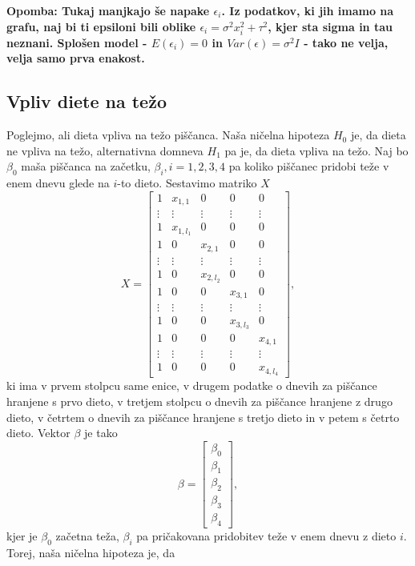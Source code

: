\documentclass[a4paper,12pt]{article}
\begin{document}
\textbf{Opomba: Tukaj manjkajo še napake $\epsilon_i$. Iz podatkov, ki jih imamo na grafu, naj bi ti epsiloni bili oblike 
$\epsilon_i =\sigma^2 x_i^2 + \tau^2$, kjer sta sigma in tau neznani. Splošen model - $E(\epsilon_i)=0$ in $Var(\epsilon)= \sigma^2I$ -
tako ne velja, velja samo prva enakost.}
%
%
\subsection{Vpliv diete na težo}
Poglejmo, ali dieta vpliva na težo piščanca. Naša ničelna hipoteza $H_0$ je, da dieta ne vpliva na težo, alternativna domneva $H_1$ pa
je, da dieta vpliva na težo. Naj bo $\beta_0$ maša piščanca na začetku, $\beta_i, i = 1,2,3,4$ pa koliko piščanec pridobi teže v enem dnevu glede 
na $i$-to dieto. Sestavimo matriko $X$
$$
    X = \begin{bmatrix}
            1 & x_{1,1} & 0 & 0 & 0 \\
            \vdots & \vdots & \vdots & \vdots & \vdots \\
            1 & x_{1,l_1} & 0 & 0 & 0 \\
            1 & 0 & x_{2,1} & 0 & 0 \\
            \vdots & \vdots & \vdots & \vdots & \vdots \\
            1 & 0 & x_{2,l_2} & 0 & 0 \\
            1 & 0 & 0 & x_{3,1} & 0 \\
            \vdots & \vdots & \vdots & \vdots & \vdots \\
            1 & 0 & 0 & x_{3,l_3} & 0 \\
            1 & 0 & 0 & 0 & x_{4,1} \\
            \vdots & \vdots & \vdots & \vdots & \vdots \\
            1 & 0 & 0 & 0 & x_{4,l_4}
        \end{bmatrix},
$$ 
ki ima v prvem stolpcu same enice, v drugem podatke o dnevih za piščance hranjene s prvo dieto, v tretjem stolpcu o dnevih za piščance hranjene
z drugo dieto, v četrtem o dnevih za piščance hranjene s tretjo dieto in v petem s četrto dieto. Vektor $\beta$ je tako
$$\beta = \begin{bmatrix}
    \beta_0 \\
    \beta_1 \\
    \beta_2 \\
    \beta_3 \\
    \beta_4 
\end{bmatrix},$$
kjer je $\beta_0$ začetna teža, $\beta_i$ pa pričakovana pridobitev teže v enem dnevu z dieto $i$. Torej, naša ničelna hipoteza je, da
\end{document}
